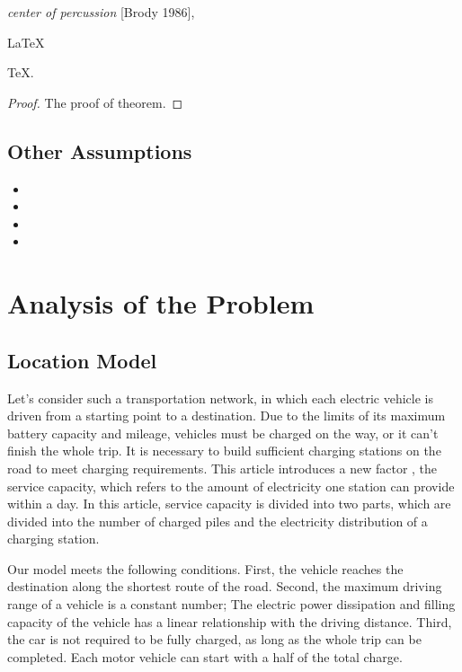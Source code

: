 \documentclass{mcmthesis}
\begin{document}
\emph{center of percussion} [Brody 1986], 

\begin{Theorem} \label{thm:latex} %
\LaTeX
\end{Theorem}
\begin{Lemma} \label{thm:tex}  %
\TeX .
\end{Lemma}
\begin{proof}
The proof of theorem.
\end{proof}

\subsection{Other Assumptions}  %

\begin{itemize}
\item
\item
\item
\item
\end{itemize}


\section{Analysis of the Problem}

\subsection {Location Model} 


      Let's consider such a transportation network, in which each electric vehicle is driven from a starting point to a destination. Due to the limits of its maximum battery capacity and mileage, vehicles must be charged on the way, or it can’t finish the whole trip. It is necessary to build sufficient charging stations on the road to meet charging requirements. This article introduces a new factor , the service capacity,  which refers to the amount of electricity one station can provide within a day.  In this article, service capacity is divided into two parts, which are divided into the number of charged piles and the electricity distribution of a charging station.

Our model meets the following conditions. First, the vehicle reaches the destination along the shortest route of the road. Second, the maximum driving range  of a vehicle is a constant number; The electric power dissipation and filling capacity of the vehicle has a linear relationship with the driving distance. Third, the car is not required to be fully charged, as long as the whole trip can be completed. Each motor vehicle can start with a half of the total charge.
\end{document}
